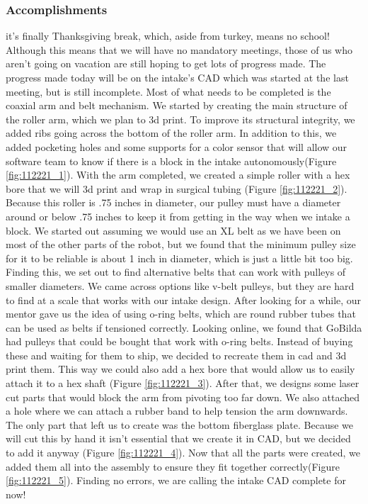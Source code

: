\subsubsection*{Accomplishments}
it's finally Thanksgiving break, which, aside from turkey, means no school! Although this means that we will have no mandatory meetings, those of us who aren't going on vacation are still hoping to get lots of progress made. The progress made today will be on the intake’s CAD which was started at the last meeting, but is still incomplete. 
Most of what needs to be completed is the coaxial arm and belt mechanism. We started by creating the main structure of the roller arm, which we plan to 3d print. To improve its structural integrity, we added ribs going across the bottom of  the roller arm. In addition to this, we added pocketing holes and some supports for a color sensor that will allow our software team to know if there is a block in the intake autonomously(Figure \ref{fig:112221_1}). 
With the arm completed, we created a simple roller with a hex bore that we will 3d print and wrap in surgical tubing (Figure \ref{fig:112221_2}). Because this roller is .75 inches in diameter, our pulley must have a diameter around or below .75 inches to keep it from getting in the way when we intake a block. We started out assuming we would use an XL belt as we have been on most of the other parts of the robot, but we found that the minimum pulley size for it to be reliable is about 1 inch in diameter, which is just a little bit too big. Finding this, we set out to find alternative belts that can work with pulleys of smaller diameters. We came across options like v-belt pulleys, but they are hard to find at a scale that works with our intake design. After looking for a while, our mentor gave us the idea of using o-ring belts, which are round rubber tubes that can be used as belts if tensioned correctly. Looking online, we found that GoBilda had pulleys that could be bought  that work with o-ring belts. Instead of buying these and waiting for them to ship, we decided to recreate them in cad and 3d print them. This way we could also add a hex bore that would allow us to easily attach it to a hex shaft (Figure \ref{fig:112221_3}). After that, we designs some laser cut parts that would block the arm from pivoting too far down. We also attached a hole where we can attach a rubber band to help tension the arm downwards. The only part that left us to create was the bottom fiberglass plate. Because we will cut this by hand it isn’t essential that we create it in CAD, but we decided to add it anyway (Figure \ref{fig:112221_4}).
Now that all the parts were created, we added them all into the assembly to ensure they fit together correctly(Figure \ref{fig:112221_5}). Finding no errors, we are calling the intake CAD complete for now!
 

